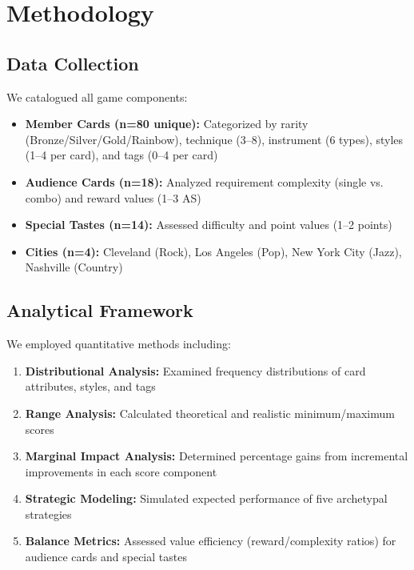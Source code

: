 \documentclass[11pt,a4paper]{article}
\begin{document}
\section{Methodology}

\subsection{Data Collection}

We catalogued all game components:

\begin{itemize}[itemsep=0pt]
    \item \textbf{Member Cards (n=80 unique):} Categorized by rarity (Bronze/Silver/Gold/Rainbow), technique (3--8), instrument (6 types), styles (1--4 per card), and tags (0--4 per card)
    \item \textbf{Audience Cards (n=18):} Analyzed requirement complexity (single vs. combo) and reward values (1--3 AS)
    \item \textbf{Special Tastes (n=14):} Assessed difficulty and point values (1--2 points)
    \item \textbf{Cities (n=4):} Cleveland (Rock), Los Angeles (Pop), New York City (Jazz), Nashville (Country)
\end{itemize}

\subsection{Analytical Framework}

We employed quantitative methods including:

\begin{enumerate}[itemsep=0pt]
    \item \textbf{Distributional Analysis:} Examined frequency distributions of card attributes, styles, and tags
    \item \textbf{Range Analysis:} Calculated theoretical and realistic minimum/maximum scores
    \item \textbf{Marginal Impact Analysis:} Determined percentage gains from incremental improvements in each score component
    \item \textbf{Strategic Modeling:} Simulated expected performance of five archetypal strategies
    \item \textbf{Balance Metrics:} Assessed value efficiency (reward/complexity ratios) for audience cards and special tastes
\end{enumerate}
\end{document}

